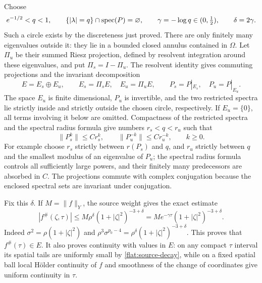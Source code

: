 Choose
\begin{equation}\label{flat:weight-choice}
 e^{-1/2}<q<1,\qquad
 \{|\lambda|=q\}\cap\operatorname{spec}(P)=\varnothing,\qquad
 \gamma=-\log q\in(0,\tfrac12),\qquad \delta=2\gamma.
\end{equation}
Such a circle exists by the discreteness just proved. There are only
finitely many eigenvalues outside it: they lie in a bounded closed
annulus contained in $\Omega$. Let $\Pi_u$ be their summed Riesz
projection, defined by resolvent integration around these
eigenvalues, and put $\Pi_s=I-\Pi_u$. The resolvent identity gives
commuting projections and the invariant decomposition
\[
 E=E_s\oplus E_u,\qquad E_s=\Pi_sE,\quad E_u=\Pi_uE,
 \qquad P_s=P|_{E_s},\quad P_u=P|_{E_u}.
\]
The space $E_u$ is finite dimensional, $P_u$ is invertible, and
the two restricted spectra lie strictly inside and strictly outside
the chosen circle, respectively. If $E_u=\{0\}$, all terms involving
it below are omitted. Compactness of the restricted spectra and the
spectral radius formula give numbers $r_s<q<r_u$ such that
\begin{equation}\label{flat:dichotomy-bounds}
 \|P_s^k\|\le C r_s^k,\qquad
 \|P_u^{-k}\|\le C r_u^{-k},\qquad k\ge0.
\end{equation}
For example choose $r_s$ strictly between $r(P_s)$ and $q$, and
$r_u$ strictly between $q$ and the smallest modulus of an eigenvalue
of $P_u$; the spectral radius formula controls all sufficiently
large powers, and their finitely many predecessors are absorbed
in $C$. The projections commute with complex conjugation because
the enclosed spectral sets are invariant under conjugation.

Fix this $\delta$. If $M=\|f\|_Y$, the source weight gives the exact
estimate
\begin{equation}\label{flat:source-decay}
 |f^\#(\zeta,\tau)|
 \le M\rho^\delta(1+|\zeta|^2)^{-3+\delta}
 =M e^{-\gamma\tau}(1+|\zeta|^2)^{-3+\delta}.
\end{equation}
Indeed $\sigma^2=\rho(1+|\zeta|^2)$ and
$\rho^3\sigma^{p_0-4}=\rho^\delta(1+|\zeta|^2)^{-3+\delta}$.
This proves that $f^\#(\tau)\in E$. It also proves continuity with
values in $E$: on any compact $\tau$ interval its spatial tails are
uniformly small by \eqref{flat:source-decay}, while on a fixed spatial
ball local H\"older continuity of $f$ and smoothness of the change of
coordinates give uniform continuity in $\tau$.

